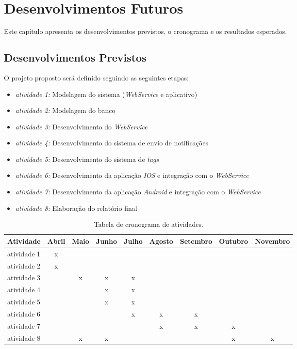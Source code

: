 \documentclass[	12pt, Times, openright, twoside, a4paper, english, brazil]{abntex2}
\begin{document}
\chapter{Desenvolvimentos Futuros}
Este capítulo apresenta os desenvolvimentos previstos, o cronograma e os resultados esperados.
\label{chapter:futuros}
\section{Desenvolvimentos Previstos}
O projeto proposto será definido seguindo as seguintes etapas:

\begin{itemize}
 \item \textit{atividade 1:} Modelagem do sistema (\textit{WebService} e aplicativo)
 \item \textit{atividade 2:} Modelagem do banco
 \item \textit{atividade 3:} Desenvolvimento do \textit{WebService}
 \item \textit{atividade 4:} Desenvolvimento do sistema de envio de notificações
 \item \textit{atividade 5:} Desenvolvimento do sistema de \textit{tags}
 \item \textit{atividade 6:} Desenvolvimento da aplicação \textit{IOS} e integração com o \textit{WebService}
 \item \textit{atividade 7:} Desenvolvimento da aplicação \textit{Android} e integração com o \textit{WebService}
 \item \textit{atividade 8:} Elaboração do relatório final
\end{itemize}

\begin{table}[!h]
\caption{Tabela de cronograma de atividades.} \label{tabela:cronograma}
\begin{center}
\begin{tabular}{|l|c|c|c|c|c|c|c|c|}
\hline
{\bf Atividade} &     Abril &     Maio &     Junho &     Julho &     Agosto &     Setembro &   Outubro &  Novembro \\
\hline
atividade 1 & x  & & & & & & &       \\
\hline
atividade 2 & x  & & & & & & &       \\
\hline
atividade 3 & & x  & x  & x  & & & &       \\
\hline
atividade 4 & & & x  & x  & & & &       \\
\hline
atividade 5 & & & x  &x  & & & &       \\
\hline
atividade 6 & & & & x  & x  & x  & &       \\
\hline
atividade 7 & & & & & x  & x  & x  &       \\
\hline
atividade 8 & & x  & x  & & &  & x  &  x     \\

\hline
\end{tabular}
\end{center}
\end{table}
\end{document}
